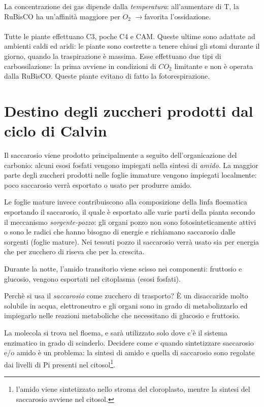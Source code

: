 \documentclass[a4paper,12pt]{book}
\newcommand{\lfreccia}{\ensuremath{\longrightarrow}}
\begin{document}
La concentrazione dei gas dipende dalla \emph{temperatura}: all'aumentare di T, la RuBisCO ha un'affinità maggiore per $O_{2}$ \lfreccia favorita l'ossidazione.

\paragraph{}
Tutte le piante effettuano C3, poche C4 e CAM. Queste ultime sono adattate ad ambienti caldi ed aridi: le piante sono costrette a tenere chiusi gli stomi durante il giorno, quando la traspirazione è massima. Esse effettuano due tipi di carbossilazione: la prima  avviene in condizioni di $CO_{2}$ limitante e non è operata dalla RuBisCO. Queste piante evitano di fatto la fotorespirazione.

\section{Destino degli zuccheri prodotti dal ciclo di Calvin}

Il saccarosio viene prodotto principalmente a seguito dell'organicazione del carbonio: alcuni esosi fosfati vengono impiegati nella sintesi di \emph{amido}.
La maggior parte degli zuccheri prodotti nelle foglie immature vengono impiegati localmente: poco saccarosio verrà esportato o usato per produrre amido.

Le foglie mature invece contribuiscono alla composizione della linfa floematica esportando il saccarosio, il quale è esportato alle varie parti della pianta secondo il meccanismo \emph{sorgente-pozzo}: gli organi pozzo non sono fotosinteticamente attivi o sono le radici che hanno bisogno di energie e richiamano saccarosio dalle sorgenti (foglie mature). Nei tessuti pozzo il saccarosio verrà usato sia per energia che per zucchero di riseva che per la crescita.

Durante la notte, l'amido transitorio viene scisso nei componenti: fruttosio e glucosio, vengono esportati nel citoplasma (esosi fosfati).

Perchè si usa il \emph{saccarosio} come zucchero di trasporto? È un disaccaride molto solubile in acqua, elettroneutro e gli organi sono in grado di metabolizzarlo ed impiegarlo nelle reazioni metaboliche che necessitano di glucosio e fruttosio.

La molecola si trova nel floema, e sarà utilizzato solo dove c'è il sistema enzimatico in grado di scinderlo. Decidere come e quando sintetizzare saccarosio e/o amido è un problema: la sintesi di amido e quella di saccarosio sono regolate dai livelli di Pi presenti nel citosol\footnote{l'amido viene sintetizzato nello stroma del cloroplasto, mentre la sintesi del saccarosio avviene nel citosol.}.
\end{document}
